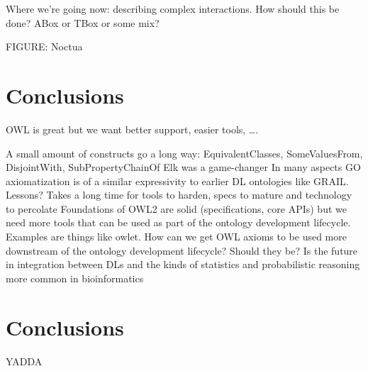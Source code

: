 \documentclass{llncs}
\begin{document}
Where we’re going now: describing complex interactions. How should this be done? ABox or TBox or some mix? 

FIGURE: Noctua

\section{Conclusions}


OWL is great but we want better support, easier tools, ….

A small amount of constructs go a long way: EquivalentClasses, SomeValuesFrom, DisjointWith, SubProperty{Chain}Of
Elk was a game-changer
In many aspects GO axiomatization is of a similar expressivity to earlier DL ontologies like GRAIL. Lessons? Takes a long time for tools to harden, specs to mature and technology to percolate
Foundations of OWL2 are solid (specifications, core APIs) but we need more tools that can be used as part of the ontology development lifecycle. Examples are things like owlet.
How can we get OWL axioms to be used more downstream of the ontology development lifecycle? Should they be? Is the future in integration between DLs and the kinds of statistics and probabilistic reasoning more common in bioinformatics























\section{Conclusions}

YADDA



\end{document}

